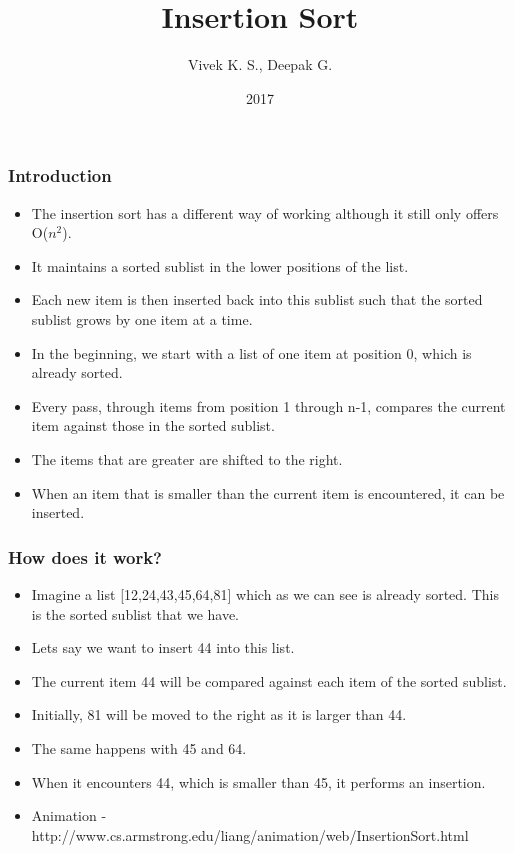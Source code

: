 \documentclass{beamer}
\title{Insertion Sort}
\author{Vivek K. S., Deepak G.}
\institute{Information Systems Decision Sciences (ISDS)\\
MUMA College of Business\\
University of South Florida \\
Tampa, Florida}
\date{2017}
\begin{document}
\frame{\titlepage}
\begin{frame}
\frametitle{Introduction}
\begin{itemize}
\item The insertion sort has  a different way of working although it still only offers O($n^2$).
\item It maintains a sorted sublist in the lower positions of the list.
\item Each new item is then inserted back into this sublist such that the sorted sublist grows by one item at a time.
\item In the beginning, we start with a list of one item at position 0, which is already sorted.
\item Every pass, through items from position 1 through n-1, compares the current item against those in the sorted sublist.
\item The items that are greater are shifted to the right.
\item When an item that is smaller than the current item is encountered, it can be inserted.
\end{itemize}
\end{frame}


\begin{frame}
\frametitle{How does it work?}
\begin{itemize}
\item Imagine a list [12,24,43,45,64,81] which as we can see is already sorted. This  is the sorted sublist that we have.
\item Lets say we want to insert 44 into this list.
\item The current item 44 will be compared against each item of the sorted sublist.
\item Initially, 81 will be moved to the right as it is larger than 44. 
\item The same happens with 45 and 64.
\item When it encounters 44, which is smaller than 45, it performs an insertion.
\item Animation - http://www.cs.armstrong.edu/liang/animation/web/InsertionSort.html
\end{itemize}
\end{frame}
\end{document}
